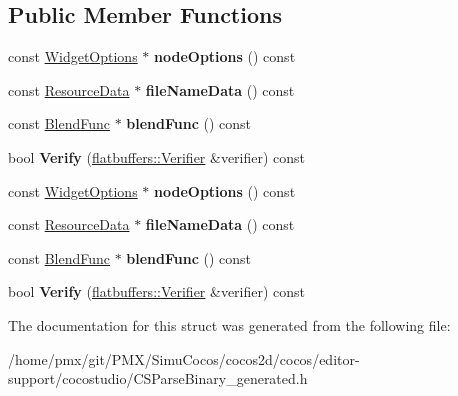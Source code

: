 \subsection*{Public Member Functions}
\begin{DoxyCompactItemize}
\item 
\mbox{\label{structflatbuffers_1_1ParticleSystemOptions_ad5547c580db8260e7fff52f93da9438d}} 
const \hyperlink{structflatbuffers_1_1WidgetOptions}{Widget\+Options} $\ast$ {\bfseries node\+Options} () const
\item 
\mbox{\label{structflatbuffers_1_1ParticleSystemOptions_a561d7e4584aafb886eed4b4531f533c8}} 
const \hyperlink{structflatbuffers_1_1ResourceData}{Resource\+Data} $\ast$ {\bfseries file\+Name\+Data} () const
\item 
\mbox{\label{structflatbuffers_1_1ParticleSystemOptions_a58dcf61652a44d133d7d31a332ab2199}} 
const \hyperlink{structBlendFunc}{Blend\+Func} $\ast$ {\bfseries blend\+Func} () const
\item 
\mbox{\label{structflatbuffers_1_1ParticleSystemOptions_a84ba8d90dcb0c8b24bf19749435be932}} 
bool {\bfseries Verify} (\hyperlink{classflatbuffers_1_1Verifier}{flatbuffers\+::\+Verifier} \&verifier) const
\item 
\mbox{\label{structflatbuffers_1_1ParticleSystemOptions_ad5547c580db8260e7fff52f93da9438d}} 
const \hyperlink{structflatbuffers_1_1WidgetOptions}{Widget\+Options} $\ast$ {\bfseries node\+Options} () const
\item 
\mbox{\label{structflatbuffers_1_1ParticleSystemOptions_a561d7e4584aafb886eed4b4531f533c8}} 
const \hyperlink{structflatbuffers_1_1ResourceData}{Resource\+Data} $\ast$ {\bfseries file\+Name\+Data} () const
\item 
\mbox{\label{structflatbuffers_1_1ParticleSystemOptions_a58dcf61652a44d133d7d31a332ab2199}} 
const \hyperlink{structBlendFunc}{Blend\+Func} $\ast$ {\bfseries blend\+Func} () const
\item 
\mbox{\label{structflatbuffers_1_1ParticleSystemOptions_a84ba8d90dcb0c8b24bf19749435be932}} 
bool {\bfseries Verify} (\hyperlink{classflatbuffers_1_1Verifier}{flatbuffers\+::\+Verifier} \&verifier) const
\end{DoxyCompactItemize}


The documentation for this struct was generated from the following file\+:\begin{DoxyCompactItemize}
\item 
/home/pmx/git/\+P\+M\+X/\+Simu\+Cocos/cocos2d/cocos/editor-\/support/cocostudio/C\+S\+Parse\+Binary\+\_\+generated.\+h\end{DoxyCompactItemize}

